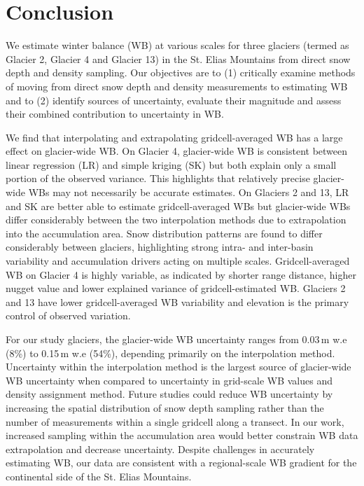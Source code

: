 \documentclass[twocolumn, letterpaper]{igs}
\begin{document}
\section{Conclusion}

We estimate winter balance (WB) at various scales for three glaciers (termed as Glacier 2, Glacier 4 and Glacier 13) in the St. Elias Mountains from direct snow depth and density sampling. Our objectives are to (1) critically examine methods of moving from direct snow depth and density measurements to estimating WB and to (2) identify sources of uncertainty, evaluate their magnitude and assess their combined contribution to uncertainty in WB.

We find that interpolating and extrapolating gridcell-averaged WB has a large effect on glacier-wide WB. On Glacier 4, glacier-wide WB is consistent between linear regression (LR) and simple kriging (SK) but both explain only a small portion of the observed variance. This highlights that relatively precise glacier-wide WBs may not necessarily be accurate estimates. On Glaciers 2 and 13, LR and SK are better able to estimate gridcell-averaged WBs but glacier-wide WBs differ considerably between the two interpolation methods due to extrapolation into the accumulation area. Snow distribution patterns are found to differ considerably between glaciers, highlighting strong intra- and inter-basin variability and accumulation drivers acting on multiple scales. Gridcell-averaged WB on Glacier 4 is highly variable, as indicated by shorter range distance, higher nugget value and lower explained variance of gridcell-estimated WB. Glaciers 2 and 13 have lower gridcell-averaged WB variability and elevation is the primary control of observed variation.

For our study glaciers, the glacier-wide WB uncertainty ranges from 0.03\,m w.e (8\%) to 0.15\,m w.e (54\%), depending primarily on the interpolation method. Uncertainty within the interpolation method is the largest source of glacier-wide WB uncertainty when compared to uncertainty in grid-scale WB values and density assignment method. Future studies could reduce WB uncertainty by increasing the spatial distribution of snow depth sampling rather than the number of measurements within a single gridcell along a transect. In our work, increased sampling within the accumulation area would better constrain WB data extrapolation and decrease uncertainty. Despite challenges in accurately estimating WB, our data are consistent with a regional-scale WB gradient for the continental side of the St. Elias Mountains. 
\end{document}
